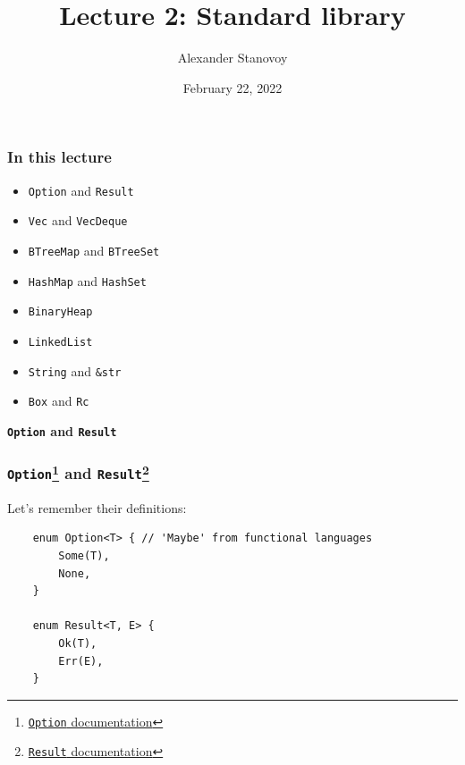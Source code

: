 \documentclass[aspectratio=1610,t]{beamer}
\title{Lecture 2: Standard library}
\date{February 22, 2022}
\author{Alexander Stanovoy}
\institute{alex.stanovoy@gmail.com}
\begin{document}

\begin{frame}
\maketitle
\end{frame}


\begin{frame}[fragile]
\frametitle{In this lecture}
\begin{itemize}
    \item \texttt{Option} and \texttt{Result}
    \item \texttt{Vec} and \texttt{VecDeque}
    \item \texttt{BTreeMap} and \texttt{BTreeSet}
    \item \texttt{HashMap} and \texttt{HashSet}
    \item \texttt{BinaryHeap}
    \item \texttt{LinkedList}
    \item \texttt{String} and \texttt{\&str}
    \item \texttt{Box} and \texttt{Rc}
\end{itemize}
\end{frame}


\begin{frame}[c]
\centering\Huge\textbf{\texttt{Option} and \texttt{Result}}
\end{frame}


\begin{frame}[fragile]
\frametitle{\texttt{Option}\footnote{\href{https://doc.rust-lang.org/std/option/enum.Option.html}{\texttt{Option} documentation}} and \texttt{Result}\footnote{\href{https://doc.rust-lang.org/std/result/enum.Result.html}{\texttt{Result} documentation}}}
Let's remember their definitions:

\begin{verbatim}
    enum Option<T> { // 'Maybe' from functional languages
        Some(T),
        None,
    }

    enum Result<T, E> {
        Ok(T),
        Err(E),
    }
\end{verbatim}
\end{frame}
\end{document}
